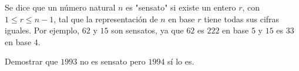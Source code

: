  Se dice que un número natural $n$ es "sensato" si existe un entero $r$, con $1\leq r \leq n-1$, tal que la representación de $n$ en base $r$ tiene todas sus cifras iguales. Por ejemplo, $62$ y $15$ son sensatos, ya que $62$ es $222$ en base $5$ y $15$ es $33$ en base $4$.

Demostrar que $1993$ no es sensato pero $1994$ sí lo es. 